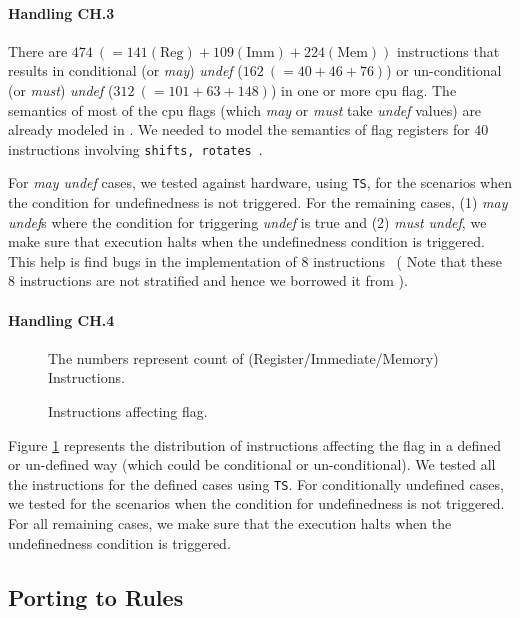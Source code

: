     \paragraph{Handling CH.3} There are $474\ (= 141(\text{Reg}) +
        109(\text{Imm}) + 224(\text{Mem}))$ instructions that results in
    conditional  (or \emph{may}) \emph{undef} ($162\ (= 40 + 46 + 76)$) or
    un-conditional (or \emph{must}) \emph{undef} ($312\ (= 101 + 63 + 148)$)  in
    one or more cpu flag.  The semantics of most of the cpu flags (which
        \emph{may} or \emph{must} take \emph{undef} values) are already modeled
    in \Stoke. We needed to model the semantics of flag registers for $40$
    instructions involving {\tt shifts, rotates}~\cite{BugStoke986}. 
    
    For \emph{may undef} cases, we tested against hardware, using {\tt TS}, for
    the scenarios when the condition for undefinedness is not triggered.  For
    the remaining cases, (1) \emph{may undef}s where the condition for
    triggering \emph{undef} is true and (2) \emph{must undef}, we make sure that
    \K execution halts when the undefinedness condition is triggered. This help
    is find bugs in the \Stoke implementation of $8$
    instructions~\cite{BugStoke986} ( Note that these $8$ instructions are not
        stratified and hence we borrowed it from \Stoke).   
    
    
   \paragraph{Handling CH.4}
   \begin{figure}[t]
       \centering
       \caption{Instructions affecting  flag.} The numbers represent count of (Register/Immediate/Memory) Instructions. 
       \label{fig:AD}
   \end{figure}

   Figure \ref{fig:AD} represents the distribution of instructions affecting the
    flag in a defined or un-defined way (which could be conditional or
       un-conditional).  We tested all the instructions for the defined cases
   using {\tt TS}. For conditionally undefined cases, we tested for the
   scenarios when the condition for undefinedness is not triggered.  For all
   remaining cases,  we make sure that the \K execution halts when the
   undefinedness condition is triggered.        
   
   
   
\subsection{Porting to \K Rules}

